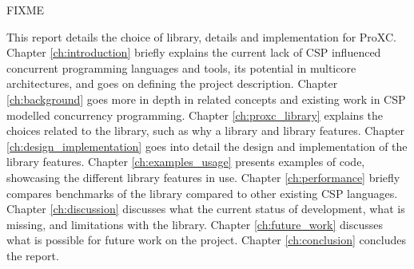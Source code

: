 FIXME

This report details the choice of library, details and implementation for ProXC. Chapter \ref{ch:introduction} briefly explains the current lack of CSP influenced concurrent programming languages and tools, its potential in multicore architectures, and goes on defining the project description. Chapter \ref{ch:background} goes more in depth in related concepts and existing work in CSP modelled concurrency programming. Chapter \ref{ch:proxc_library} explains the choices related to the library, such as why a library and library features. Chapter \ref{ch:design_implementation} goes into detail the design and implementation of the library features. Chapter \ref{ch:examples_usage} presents examples of code, showcasing the different library features in use. Chapter \ref{ch:performance} briefly compares benchmarks of the library compared to other existing CSP languages. Chapter \ref{ch:discussion} discusses what the current status of development, what is missing, and limitations with the library. Chapter \ref{ch:future_work} discusses what is possible for future work on the project. Chapter \ref{ch:conclusion} concludes the report.

